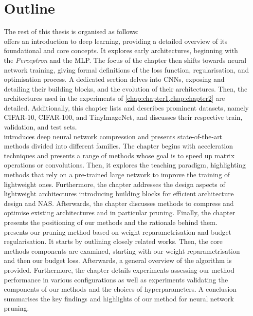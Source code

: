 \section{Outline}

The rest of this thesis is organised as follows:\\

 offers an introduction to deep learning, providing a detailed
overview of its foundational and core concepts. It explores early architectures,
beginning with the \emph{Perceptron} and the \ac{MLP}. The focus of the chapter
then shifts towards neural network training, giving formal definitions of the
loss function, regularisation, and optimisation process. A dedicated section
delves into \aclp{CNN}, exposing and detailing their building blocks, and the
evolution of their architectures. Then, the architectures used in the
experiments of \cref{chap:chapter1,chap:chapter2} are detailed. Additionally,
this chapter lists and describes prominent datasets, namely CIFAR-10, CIFAR-100,
and TinyImageNet, and discusses their respective train, validation, and test
sets.\\

 introduces deep neural network compression and presents
state-of-the-art methods divided into different families. The chapter begins
with acceleration techniques and presents a range of methods whose goal is to
speed up matrix operations or convolutions. Then, it explores the teaching
paradigm, highlighting methods that rely on a pre-trained large network to
improve the training of lightweight ones. Furthermore, the chapter addresses the
design aspects of lightweight architectures introducing building blocks for
efficient architecture design and \acl{NAS}. Afterwards, the chapter discusses
methods to compress and optimise existing architectures and in particular
pruning. Finally, the chapter presents the positioning of our methods and the
rationale behind them.\\

 presents our pruning method based on weight
reparametrisation and budget regularisation. It starts by outlining closely
related works. Then, the core methods components are examined, starting with our
weight reparametrisation and then our budget loss. Afterwards, a general
overview of the algorithm is provided. Furthermore, the chapter details
experiments assessing our method performance in various configurations as well
as experiments validating the components of our methods and the choices of
hyperparameters. A conclusion summarises the key findings and highlights of our
method for neural network pruning.\\

